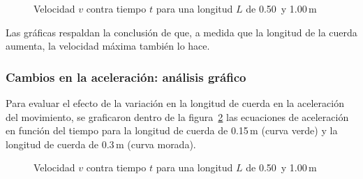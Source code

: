 \documentclass[letterpaper]{report}
\numberwithin{table}{section}
\begin{document}
\begin{figure}[H]
  \centering
  \caption{Velocidad $v$ contra tiempo $t$ para una longitud $L$ de
  0.50\, y 1.00\,m}\label{fig:velocidad_tiempo_longitudes3}
\end{figure}

Las gráficas respaldan la conclusión de que, a medida que la longitud
de la cuerda aumenta, la velocidad máxima también lo hace.

\subsubsection{Cambios en la aceleración: análisis gráfico}

Para evaluar el efecto de la variación en la longitud de cuerda en la
aceleración del movimiento, se graficaron dentro de la
figura~\ref{fig:aceleración_tiempo} las ecuaciones de
aceleración en función del tiempo para la longitud de cuerda de
0.15\,m (curva verde) y la longitud de cuerda de 0.3\,m (curva morada).

\begin{figure}[H]
  \centering
  \caption{Velocidad $v$ contra tiempo $t$ para una longitud $L$ de
  0.50\, y 1.00\,m}\label{fig:aceleración_tiempo}
\end{figure}
\end{document}
